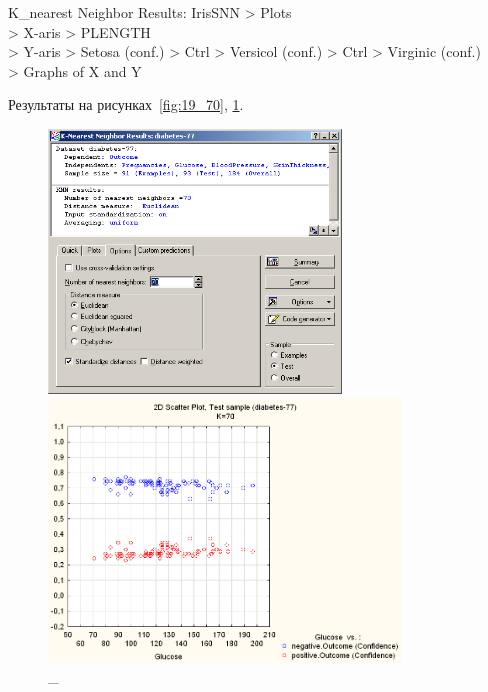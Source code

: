 K\_nearest Neighbor Results: IrisSNN > Plots \\
> X-aris > PLENGTH \\
> Y-aris > Setosa (conf.) > Ctrl > Versicol (conf.) > Ctrl > Virginic (conf.) \\
> Graphs of X and Y

Результаты на рисунках~\ref{fig:19_70}, \ref{fig:20_70}.

\begin{figure}[!h]
  \centering

  \begin{minipage}{0.49\textwidth}
    \centering

    \includegraphics[height=7cm]
    {inc/v5_26.PNG}

    \caption{\_}

    \label{fig:19_70}
  \end{minipage}
  \begin{minipage}{0.49\textwidth}
    \centering

    \includegraphics[height=7cm]
    {inc/v5_27.PNG}

    \caption{\_}

    \label{fig:20_70}
  \end{minipage}
\end{figure}

